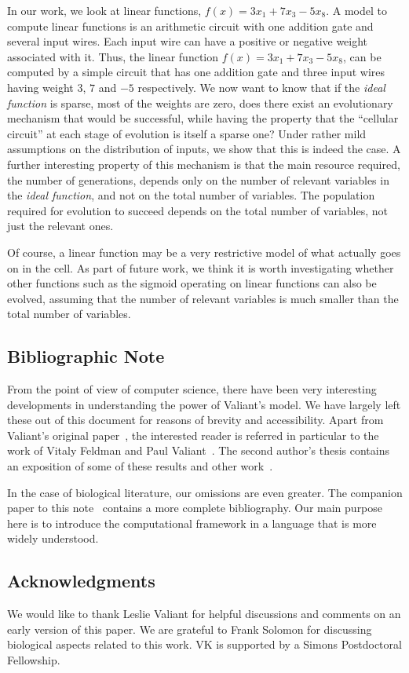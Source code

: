 \documentclass{acmtr2e}
\begin{document}
In our work, we look at linear functions, \eg $f(x) = 3x_1 + 7 x_3 - 5 x_8$.  A
model to compute linear functions is an arithmetic circuit with one addition
gate and several input wires. Each input wire can have a positive or negative
weight associated with it.  Thus, the linear function $f(x) = 3x_1 + 7 x_3
-5x_8$, can be computed by a simple circuit that has one addition gate and three
input wires having weight $3$, $7$ and $-5$ respectively. We now want to know
that if the \emph{ideal function} is sparse, \ie most of the weights are zero,
does there exist an evolutionary mechanism that would be successful, while
having the property that the ``cellular circuit'' at each stage of evolution is
itself a sparse one? Under rather mild assumptions on the distribution of
inputs, we show that this is indeed the case. A further interesting property of
this mechanism is that the main resource required, the number of generations,
depends only on the number of relevant variables in the \emph{ideal function},
and not on the total number of variables. The population required for evolution
to succeed depends on the total number of variables, not just the relevant ones.

Of course, a linear function may be a very restrictive model of what actually
goes on in the cell. As part of future work, we think it is worth investigating
whether other functions such as the sigmoid operating on linear functions can also
be evolved, assuming that the number of relevant variables is much smaller than
the total number of variables.

\subsection*{Bibliographic Note}

From the point of view of computer science, there have been very interesting
developments in understanding the power of Valiant's model. We have largely left
these out of this document for reasons of brevity and accessibility. Apart from
Valiant's original paper~\cite{Valiant:2009-evolvability},
the interested reader is referred in particular to the work of Vitaly Feldman
and Paul Valiant~\cite{Feldman:2008-evolvability,Feldman:2009-robustness,Feldman:2011-LTF,Valiant:2012-real}.
The second author's thesis contains an exposition of some of these results and
other work~\cite{Kanade:2012-thesis}.

In the case of biological literature, our omissions are even greater. The
companion paper to this note~\cite{AK:2013} contains a more complete
bibliography. Our main purpose here is to introduce the computational framework
in a language that is more widely understood.

\subsection*{Acknowledgments} 
We would like to thank Leslie Valiant for helpful discussions and comments on an
early version of this paper. We are grateful to Frank Solomon for discussing
biological aspects related to this work. VK is supported by a Simons
Postdoctoral Fellowship.



\end{document}
